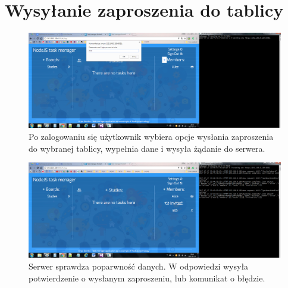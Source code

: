 \documentclass[12pt]{report}
\begin{document}
\section{Wysyłanie zaproszenia do tablicy}
\begin{figure}[!hb]
\centering
\includegraphics[width=\textwidth,height=\textheight,keepaspectratio]{01.png}
\captionsetup{labelformat=empty}
\caption[]{Po zalogowaniu się użytkownik wybiera opcje wysłania zaproszenia do wybranej tablicy, wypełnia dane i wysyła żądanie do serwera.}
\end{figure}
\begin{figure}[!hb]
\centering
\includegraphics[width=\textwidth,height=\textheight,keepaspectratio]{02.png}
\captionsetup{labelformat=empty}
\caption[]{Serwer sprawdza poparwność danych. 
W odpowiedzi wysyła potwierdzenie o wysłanym zaproszeniu, lub komunikat o błędzie.}
\end{figure}
\end{document}
